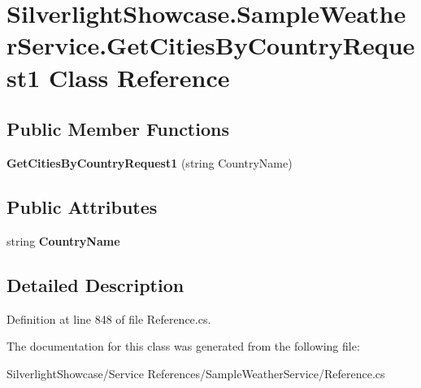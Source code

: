 \hypertarget{class_silverlight_showcase_1_1_sample_weather_service_1_1_get_cities_by_country_request1}{
\section{SilverlightShowcase.SampleWeatherService.GetCitiesByCountryRequest1 Class Reference}
\label{class_silverlight_showcase_1_1_sample_weather_service_1_1_get_cities_by_country_request1}
}
\subsection*{Public Member Functions}
\begin{DoxyCompactItemize}
\item 
\hypertarget{class_silverlight_showcase_1_1_sample_weather_service_1_1_get_cities_by_country_request1_a11133463890662d83f2d5d90c0f232fa}{
{\bfseries GetCitiesByCountryRequest1} (string CountryName)}
\label{class_silverlight_showcase_1_1_sample_weather_service_1_1_get_cities_by_country_request1_a11133463890662d83f2d5d90c0f232fa}

\end{DoxyCompactItemize}
\subsection*{Public Attributes}
\begin{DoxyCompactItemize}
\item 
\hypertarget{class_silverlight_showcase_1_1_sample_weather_service_1_1_get_cities_by_country_request1_aad3858a91deb20b995fd9735ab0c9491}{
string {\bfseries CountryName}}
\label{class_silverlight_showcase_1_1_sample_weather_service_1_1_get_cities_by_country_request1_aad3858a91deb20b995fd9735ab0c9491}

\end{DoxyCompactItemize}


\subsection{Detailed Description}


Definition at line 848 of file Reference.cs.

The documentation for this class was generated from the following file:\begin{DoxyCompactItemize}
\item 
SilverlightShowcase/Service References/SampleWeatherService/Reference.cs\end{DoxyCompactItemize}
